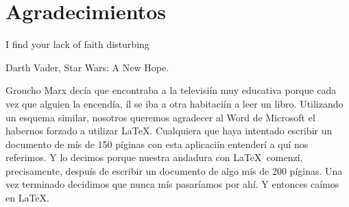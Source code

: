 %
%
%
%
%
%
%
%
%
%
%
%
%

\chapter{Agradecimientos}


\begin{FraseCelebre}
\begin{Frase}
I find your lack of faith disturbing\end{Frase}
\begin{Fuente}
Darth Vader, Star Wars: A New Hope.
\end{Fuente}
\end{FraseCelebre}

Groucho Marx decía que encontraba a la televisiín muy educativa porque
cada vez que alguien la encendía, íl se iba a otra habitaciín a leer
un libro. Utilizando un esquema similar, nosotros queremos agradecer
al Word de Microsoft el habernos forzado a utilizar \LaTeX. Cualquiera
que haya intentado escribir un documento de mís de 150 píginas con
esta aplicaciín entenderí a quí nos referimos. Y lo decimos porque
nuestra andadura con \LaTeX\ comenzí, precisamente, despuís de
escribir un documento de algo mís de 200 píginas. Una vez terminado
decidimos que nunca mís pasaríamos por ahí. Y entonces caímos en
\LaTeX.

